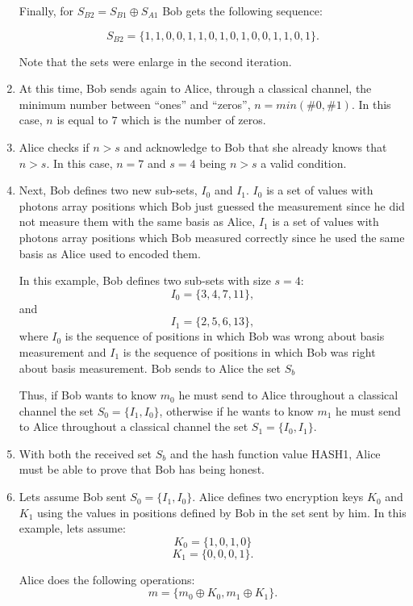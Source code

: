 \begin{enumerate}
    Finally, for $S_{B2}=S_{B1} \oplus S_{A1}$ Bob gets the following sequence:

    $$S_{B2}= \{1,1,0,0,1,1,0,1,0,1,0,0,1,1,0,1 \}.$$

    Note that the sets were enlarge in the second iteration.

  \item At this time, Bob sends again to Alice, through a classical channel, the minimum number between  ``ones'' and ``zeros'',  $n=min(\#0,\#1)$. In this case, $n$ is equal to $7$ which is the number of zeros.

  \item Alice checks if $n>s$ and acknowledge to Bob that she already knows that $n>s$. In this case, $n=7$ and $s=4$ being $n>s$ a valid condition.

  \item Next, Bob defines two new sub-sets, $I_{0}$ and $I_{1}$. $I_{0}$ is a set of values with photons array positions which Bob just guessed the measurement since he did not measure them with the same basis as Alice, $I_{1}$ is a set of values with photons array positions which Bob measured correctly since he used the same basis as Alice used to encoded them.

  In this example, Bob defines two sub-sets with size $s=4$:
  $$I_{0}=\{3,4,7,11 \},$$
  and $$I_{1}= \{2,5,6,13 \},$$ where $I_{0}$ is the sequence of positions in which Bob was wrong about basis measurement and $I_{1}$ is the sequence of positions in which Bob was right about basis measurement. Bob sends to Alice the set $S_{b}$

  Thus, if Bob wants to know $m_{0}$ he must send to Alice throughout a classical channel the set $S_{0}=\{I_{1},I_{0} \}$, otherwise if he wants to know $m_{1}$ he must send to Alice throughout a classical channel the set $S_{1}=\{I_{0},I_{1} \}$.


  \item With both the received set $S_{b}$ and the hash function value HASH1, Alice must be able to prove that Bob has being honest. 

  \item Lets assume Bob sent $S_{0}=\{I_{1},I_{0} \}$.
   Alice defines two encryption keys $K_{0}$ and $K_{1}$ using the values in positions defined by Bob in the set sent by him. In this example, lets assume: $$K_{0}=\{1,0,1,0\}$$ $$K_{1}=\{0,0,0,1\}.$$

   Alice does the following operations:
   $$m = \{m_{0}\oplus K_{0}, m_{1} \oplus K_{1} \}.$$


\end{enumerate}
